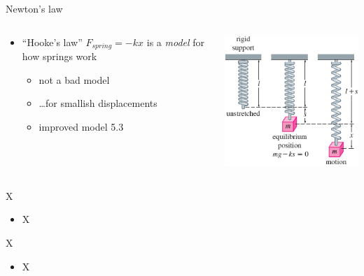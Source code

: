 \documentclass{beamer}
\begin{document}
\begin{frame}{Newton's law}
\begin{columns}
\begin{column}{0.65\textwidth}
\begin{itemize}
\item ``Hooke's law'' $F_{spring} = -kx$ is a \emph{model} for how springs work
    \begin{itemize}
    \item not a bad model
    \item \dots for smallish displacements
    \item improved model 5.3
    \end{itemize}
\end{itemize}
\end{column}
\begin{column}{0.35\textwidth}
\includegraphics[width=\textwidth]{figs/mass-spring-setup}
\end{column}
\end{columns}
\end{frame}


\begin{frame}{X}

\begin{itemize}
\item X
\end{itemize}
\end{frame}


\begin{frame}{X}

\begin{itemize}
\item X
\end{itemize}
\end{frame}
\end{document}
